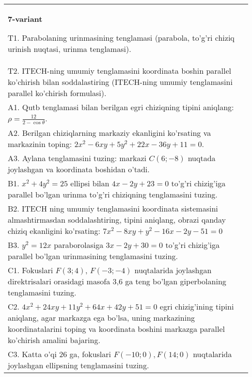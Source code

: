\documentclass{article}
\begin{document}
\begin{tabular}{m{17cm}}
\textbf{7-variant}
\newline

T1. Parabolaning urinmasining tenglamasi (parabola, to'g'ri chiziq urinish nuqtasi, urinma tenglamasi).\\

T2. ITECH-ning umumiy tenglamasini koordinata boshin parallel ko'chirish bilan soddalastiring (ITECH-ning umumiy tenglamasini parallel ko'chirish formulasi).\\

A1. Qutb tenglamasi bilan berilgan egri chiziqning tipini aniqlang: $\rho=\frac{12}{2-\cos\theta}$.\\

A2. Berilgan chiziqlarning markaziy ekanligini ko'rsating va markazinin toping: $2x^{2}-6xy+5y^{2}+22x-36y+11=0$.\\

A3. Aylana tenglamasini tuzing: markazi $C(6;-8)$ nuqtada joylashgan va koordinata boshidan o'tadi.\\

B1. $x^{2} + 4y^{2} = 25$ ellipsi bilan $4x - 2y + 23 = 0$ to'g'ri chizig'iga parallel bo'lgan urinma to'g'ri chiziqning tenglamasini tuzing.  \\

B2. ITECH ning umumiy tenglamasini koordinata sistemasini almashtirmasdan soddalashtiring, tipini aniqlang, obrazi qanday chiziq ekanligini ko'rsating: $7x^{2} - 8xy + y^{2} - 16x - 2y - 51 = 0$\\

B3. $y^{2} = 12x$ paraborolasiga $3x - 2y + 30 = 0$ to'g'ri chizig'iga parallel bo'lgan urinmasining tenglamasini tuzing.  \\

C1. Fokuslari $F(3;4)$, $F(-3;-4)$ nuqtalarida joylashgan direktrisalari orasidagi masofa 3,6 ga teng bo'lgan giperbolaning tenglamasini tuzing.  \\

C2. $4x^{2} + 24xy + 11y^{2} + 64x + 42y + 51 = 0$ egri chizig'ining tipini aniqlang, agar markazga ega bo'lsa, uning markazining koordinatalarini toping va koordinata boshini markazga parallel ko'chirish amalini bajaring.\\

C3. Katta o'qi 26 ga, fokuslari $F( - 10;0), F(14;0)$ nuqtalarida joylashgan ellipsning tenglamasini tuzing.  \\

\end{tabular}
\vspace{1cm}
\end{document}

